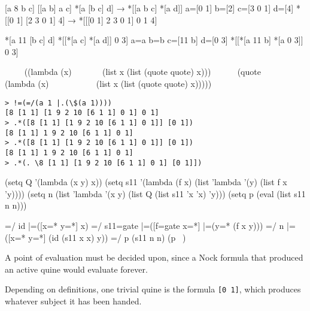 \documentclass[twoside]{article}
\begin{document}

[a 8 b c]
[[a b] a c]
*[a [b c] d] → *[[a b c] *[a d]]
a=[0 1]
b=[2]
c=[3 0 1]
d=[4]
*[[0 1] [2 3 0 1] 4] → *[[[0 1] 2 3 0 1] 0 1 4]



*[a 11 [b c] d]     *[[*[a c] *[a d]] 0 3]
a=a
b=b
c=[11 b]
d=[0 3]
*[[*[a 11 b] *[a 0 3]] 0 3]

     ((lambda (x)
       (list x (list (quote quote) x)))
      (quote
         (lambda (x)
           (list x (list (quote quote) x)))))


\begin{lstlisting}
> !=(=/(a 1 |.(\$(a 1))))
[8 [1 1] [1 9 2 10 [6 1 1] 0 1] 0 1]
> .*([8 [1 1] [1 9 2 10 [6 1 1] 0 1]] [0 1])
[8 [1 1] 1 9 2 10 [6 1 1] 0 1]
> .*([8 [1 1] [1 9 2 10 [6 1 1] 0 1]] [0 1])
[8 [1 1] 1 9 2 10 [6 1 1] 0 1]
> .*(. \8 [1 1] [1 9 2 10 [6 1 1] 0 1] [0 1]])
\end{lstlisting}

(setq Q '(lambda (x y) x))
(setq s11 '(lambda (f x) (list 'lambda '(y) (list f x 'y))))
(setq n (list 'lambda '(x y) (list Q (list s11 'x 'x) 'y)))
(setq p (eval (list s11 n n)))

=/  id  |=([x=* y=*] x)
=/  s11=gate  |=([f=gate x=*] |=(y=* (f x y)))
=/  n  |=([x=* y=*] (id (s11 x x) y))
=/  p  (s11 n n)
(p ~)

A point of evaluation must be decided upon, since a Nock formula that produced an active quine would evaluate forever.

Depending on definitions, one trivial quine is the formula \texttt{[0 1]}, which produces whatever subject it has been handed.



\printbibliography
\end{document}
